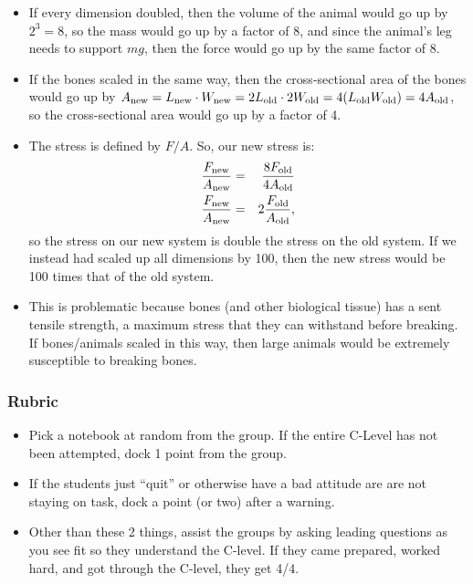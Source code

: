 \documentclass[fleqn,letterpaper]{article}
\begin{document}
\begin{itemize}
 \item{If every dimension doubled, then the volume of the animal would go up by $2^3 = 8$, so the mass would go up by a factor of 8, and since the animal's leg needs to support $mg$, then the force would go up by the same factor of 8.}
 \item{If the bones scaled in the same way, then the cross-sectional area of the bones would go up by $A_{\rm new} = L_{\rm new}\cdot W_{\rm new} = 2 L_{\rm old} \cdot 2 W_{\rm old} = 4 (L_{\rm old} W_{\rm old}) = 4A_{\rm old}$, so the cross-sectional area would go up by a factor of 4.}
 \item{The stress is defined by $F/A$.  So, our new stress is:
  \begin{eqnarray}
   \frac{F_{\rm new}}{A_{\rm new}} & = & \frac{8 F_{\rm old}}{4 A_{\rm old}} \\
   \frac{F_{\rm new}}{A_{\rm new}}& = & 2\frac{ F_{\rm old}}{A_{\rm old}},
  \end{eqnarray}
  so the stress on our new system is double the stress on the old system.  If we instead had scaled up all dimensions by 100, then the new stress would be 100 times that of the old system.}
  \item{This is problematic because bones (and other biological tissue) has a sent tensile strength, a maximum stress that they can withstand before breaking.  If bones/animals scaled in this way, then large animals would be extremely susceptible to breaking bones.}
\end{itemize}
 


\subsubsection*{Rubric}

\begin{itemize}
 \item{Pick a notebook at random from the group.  If the entire C-Level has not been attempted, dock 1 point from the group.}
 \item{If the students just ``quit'' or otherwise have a bad attitude are are not staying on task, dock a point (or two) after a warning.}
 \item{Other than these 2 things, assist the groups by asking leading questions as you see fit so they understand the C-level.  If they came prepared, worked hard, and got through the C-level, they get 4/4.}
\end{itemize}
\end{document}
